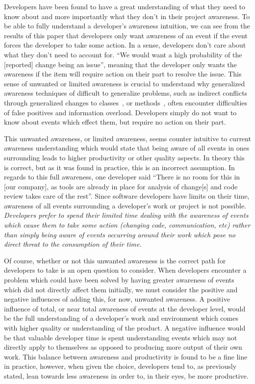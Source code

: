 Developers have been found to have a great understanding of what they need to know about and more importantly what they don't in
their project awareness. To be able to fully understand a developer's awareness intuition, we can see from the results of this paper that
developers only want awareness of an event if the event forces the developer to take some action. In a sense, developers
don't care about what they don't need to account for. ``We would want a high probability of the [reported] change being an issue'', meaning
that the developer only wants the awareness if the item will require action on their part to resolve the issue.
This sense of unwanted or limited awareness is crucial to understand why generalized
awareness techniques of difficult to generalize problems, such as indirect conflicts through generalized changes to 
classes~\cite{Sarma:2007:TSA}, or methods~\cite{Trainer:2005:BGT,Servant:2010:CPI}, often encounter difficulties of false
positives and information overload. 
Developers simply do not want to know about events which effect them, but require no action on their part. 

This unwanted awareness, or limited awareness, seems counter intuitive to current awareness understanding which would state that
being aware of all events in ones surrounding leads to higher productivity or other quality aspects. In theory this is correct,
but as it was found in practice, this is an incorrect assumption. 
In regards to this full awareness, one developer said ``There is no room for this in [our company], as tools are already in place for 
analysis of change[s] and code review takes care of the rest''. Since software developers have limits on their time, awareness of
all events surrounding a developer's work or project is not possible. \textit{Developers prefer to spend their limited time dealing with
the awareness of events which cause them to take some action (changing code, communication, etc) rather than simply being aware
of events occurring around their work which pose no direct threat to the consumption of their time.}

Of course, whether or not this unwanted awareness is the correct path for developers to take is an open question to consider. When
developers encounter a problem which could have been solved by having greater awareness of events which did not directly affect
them initially, we must consider the positive and negative influences of adding this, for now, unwanted awareness. A positive
influence of total, or near total
awareness of events at the developer level, would be the full understanding of a developer's work and environment which comes
with higher quality or understanding of the product. 
A negative influence would be that valuable developer time is spent understanding events which may not directly apply to themselves as opposed to 
producing more output of their own work. This balance between awareness and productivity is found to be a fine line in practice,
however, when given the choice, developers tend to, as previously stated, lean towards less awareness in order to, in their eyes,
be more productive.

